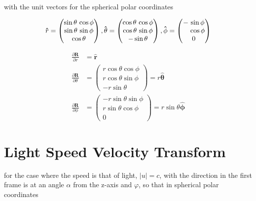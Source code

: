 with the unit vectors for the spherical polar coordinates

\begin{equation}%
	\mathbf{\hat{\text{$r$}}} =
	\begin{pmatrix}
		\sin\theta \, \cos\phi \\
		\sin\theta \, \sin\phi \\
		\cos\theta
	\end{pmatrix},
	\mathbf{\hat{\text{$\theta$}}} =
	\begin{pmatrix}
		\cos\theta \, \cos\phi \\
		\cos\theta \, \sin\phi \\
		- \sin\theta
	\end{pmatrix},
	\mathbf{\hat{\text{$\phi$}}} =
	\begin{pmatrix}
		- \, \sin\phi            \\
		\hphantom{-} \, \cos\phi \\
		0
	\end{pmatrix}
\end{equation}%

\begin{equation}%
	\begin{aligned}
		\frac{\partial\mathbf{R}}{\partial r}      & = \mathbf{\hat{\text{$r$}}} \\
		\frac{\partial\mathbf{R}}{\partial \theta} & =
		\begin{pmatrix}
			r \cos\theta  \cos\phi \\
			r \cos\theta  \sin\phi \\
			-r \sin\theta
		\end{pmatrix} =r\mathbf{\hat{\text{$\theta$}}}                           \\
		\frac{\partial\mathbf{R}}{\partial \phi}   & =
		\begin{pmatrix}
			-r \sin\theta  \sin\phi \\
			r \sin\theta  \cos\phi  \\
			0
		\end{pmatrix} = r \sin\theta \mathbf{\hat{\text{$\phi$}}}
	\end{aligned}
\end{equation}%


\section{Light Speed Velocity Transform}
for the case where the speed is that of light, $|u|=c$, with the direction in the first frame is at an angle $\alpha$ from the z-axis and $\varphi$, so that in spherical polar coordinates


